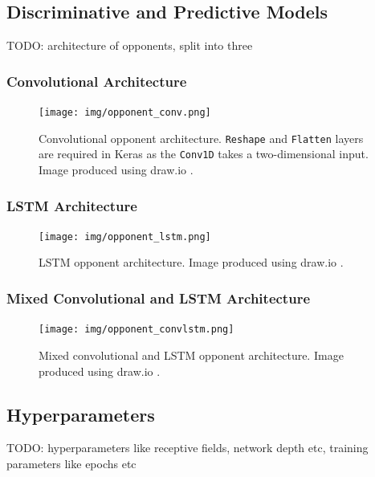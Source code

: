 \documentclass[12pt, titlepage]{report}
\theoremstyle{definition}
\begin{document}
\subsection{Discriminative and Predictive Models}
TODO: architecture of opponents, split into three



\subsubsection{Convolutional Architecture}
\begin{figure}
\centering
\texttt{[image: img/opponent\_conv.png]}\\
\caption{Convolutional opponent architecture. \texttt{Reshape} and \texttt{Flatten} layers are required in Keras as the \texttt{Conv1D} takes a two-dimensional input. Image produced using draw.io \cite{jgraph2018draw}.}
\label{figure:architecture_conv}
\end{figure}



\subsubsection{LSTM Architecture}
\begin{figure}
\centering
\texttt{[image: img/opponent\_lstm.png]}\\
\caption{LSTM opponent architecture. Image produced using draw.io \cite{jgraph2018draw}.}
\label{figure:architecture_lstm}
\end{figure}




\subsubsection{Mixed Convolutional and LSTM Architecture}
\begin{figure}
\centering
\texttt{[image: img/opponent\_convlstm.png]}\\
\caption{Mixed convolutional and LSTM opponent architecture. Image produced using draw.io \cite{jgraph2018draw}.}
\label{figure:architecture_convlstm}
\end{figure}



\subsection{Hyperparameters}
TODO: hyperparameters like receptive fields, network depth etc, training parameters like epochs etc
\end{document}
